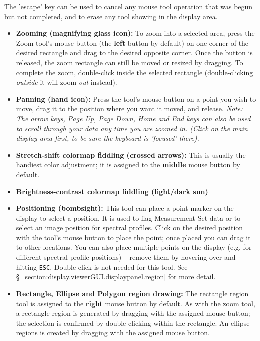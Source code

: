 The 'escape' key can be used to cancel any mouse tool operation that was
begun but not completed, and to erase any tool showing in the display area.
\begin{itemize}
   \item {\bf Zooming (magnifying glass icon):}
     To zoom into a selected area, press the Zoom tool's mouse button
     (the {\bf left} button by default) on one corner of the desired
     rectangle and drag to the desired opposite corner. Once the button is
     released, the zoom rectangle can still be moved or resized by dragging.
     To complete the zoom, double-click inside the selected rectangle
     (double-clicking {\it outside} it will zoom {\it out} instead).
   \item {\bf Panning (hand icon):} Press the tool's mouse button on a 
     point you wish to move, drag it to the position where you want it
     moved, and release. {\it Note: The arrow keys, Page Up, Page Down,
     Home and End keys can also be used to scroll through your data any time
     you are zoomed in. (Click on the main display area first, to be sure
     the keyboard is 'focused' there).}
   \item {\bf Stretch-shift colormap fiddling (crossed arrows):} This is
     usually the handiest color adjustment; it is assigned to the {\bf middle}
     mouse button by default.
   \item {\bf Brightness-contrast colormap fiddling (light/dark sun)} 
   \item {\bf Positioning (bombsight):} This tool can place a point
     marker on the display to select a position. It is used to flag
     Measurement Set data or to select an image position for spectral
     profiles.  Click on the desired position with the tool's mouse
     button to place the point; once placed you can drag it to other
     locations. You can also place multiple points on the display
     (e.g. for different spectral profile positions) -- remove them by
     hovering over and hitting {\tt ESC}.  Double-click is not needed
     for this tool.  See
     \S~\ref{section:display.viewerGUI.displaypanel.region} for more
     detail.
   \item {\bf Rectangle, Ellipse and Polygon region drawing:} The rectangle
     region tool is assigned to the {\bf right} mouse button by default.
     As with the zoom tool, a rectangle region is generated by dragging with
     the assigned mouse button; the selection is confirmed by double-clicking
     within the rectangle.
     An ellipse regions is created by dragging with the assigned mouse button.

\end{itemize}

